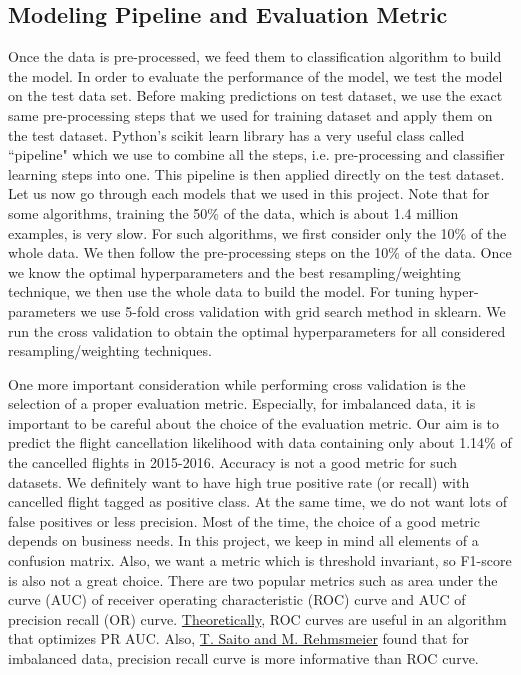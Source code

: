 \documentclass[12pt]{article}
\begin{document}
\subsection{Modeling Pipeline and Evaluation Metric}
\label{sec:pipe}
Once the data is pre-processed, we feed them to classification algorithm to build the model. In order to evaluate the performance of the model, we test the model on the test data set. Before making predictions on test dataset, we use the exact same pre-processing steps that we used for training dataset and apply them on the test dataset. Python's scikit learn library has a very useful class called ``pipeline" which we use to combine all the steps, i.e. pre-processing and classifier learning steps into one. This pipeline is then applied directly on the test dataset. Let us now go through each models that we used in this project. Note that for some algorithms, training the 50$\%$ of the data, which is about 1.4 million examples, is very slow. For such algorithms, we first consider only the 10$\%$ of the whole data. We then follow the pre-processing steps on the 10$\%$ of the data. Once we know the optimal hyperparameters  and the best resampling/weighting technique, we then use the whole data to build the model. For tuning hyper-parameters we use 5-fold cross validation with grid search method in sklearn. We run the cross validation to obtain the optimal hyperparameters for all considered resampling/weighting techniques. 


One more important consideration while performing cross validation is the selection of a proper evaluation metric. Especially, for imbalanced data, it is important to be careful about the choice of the evaluation metric. Our aim is to predict the flight cancellation likelihood with data containing only about 1.14$\%$ of the cancelled flights in 2015-2016. Accuracy is not a good metric for such datasets. We definitely want to have high true positive rate (or recall) with cancelled flight tagged as positive class. At the same time, we do not want lots of false positives or less precision. Most of the time, the choice of a good metric depends on business needs. In this project, we keep in mind all elements of a confusion matrix. Also, we want a metric which is threshold invariant, so F1-score is also not a great choice. There are two popular metrics such as area under the curve (AUC) of receiver operating characteristic (ROC) curve and AUC of precision recall (OR) curve. \href{http://ftp.cs.wisc.edu/machine-learning/shavlik-group/davis.icml06.pdf}{Theoretically}, ROC curves are useful in an algorithm that optimizes PR AUC. Also, \href{http://journals.plos.org/plosone/article?id=10.1371/journal.pone.0118432}{T. Saito and M. Rehmsmeier} found that for imbalanced data, precision recall curve is more informative than ROC curve.
\end{document}
